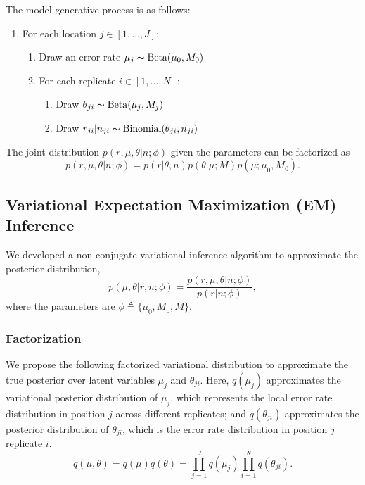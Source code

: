 \documentclass{bmcart}
\begin{document}
The model generative process is as follows:
\begin{enumerate}[noitemsep]
    \item For each location $j \in [1, \ldots, J]$:
	\begin{enumerate}
		\item Draw an error rate $\mu_j \thicksim \text{Beta}(\mu_0, M_0)$
		\item For each replicate $i \in [1, \ldots, N]$:
		\begin{enumerate}
		    \item Draw $\theta_{ji} \thicksim \text{Beta}(\mu_j, M_j)$
			\item Draw $r_{ji} | n_{ji} \thicksim \text{Binomial}(\theta_{ji}, n_{ji})$ 		
		\end{enumerate}
	\end{enumerate}
\end{enumerate}

The joint distribution $p(r, \mu, \theta|n; \phi)$ given the parameters can be factorized as
\begin{equation}
    p(r, \mu, \theta| n; \phi) = p(r |\theta, n)p(\theta |\mu; M )p(\mu;\mu_0, M_0).
\end{equation}


\subsection*{Variational Expectation Maximization (EM) Inference}
We developed a non-conjugate variational inference algorithm to approximate the posterior distribution,
\begin{equation}
	p(\mu, \theta | r, n; \phi)  = \frac{ p(r, \mu, \theta| n; \phi) } {p ( r | n; \phi)},
\end{equation}
where the parameters are $\phi \triangleq \{\mu_0, M_0, M\}$.
\subsubsection*{Factorization}
We propose the following factorized variational distribution to approximate the true posterior over latent variables $\mu_j$ and $\theta_{ji}$.
Here, $q(\mu_j)$ approximates the variational posterior distribution of $\mu_j$, which represents the local error rate distribution in position $j$ across different replicates;
and $q(\theta_{ji})$ approximates the posterior distribution of $\theta_{ji}$, which is the error rate distribution in position $j$ replicate $i$.
\begin{equation}
  q(\mu, \theta) = q(\mu)q(\theta) = \prod_{j=1}^J q(\mu_{j}) \prod_{i=1}^N q(\theta_{ji}).
  \label{eq:vardist}
\end{equation}
\end{document}
